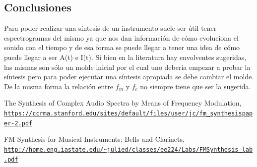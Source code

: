 \documentclass[assd_tp2_main.tex]{subfiles}
\begin{document}
\subsection{Conclusiones}
Para poder realizar una síntesis de un instrumento suele ser útil tener espectrogramas del mismo ya que nos dan información de cómo evoluciona el sonido con el tiempo y de esa forma se puede llegar a tener una idea de cómo puede llegar a ser A(t) e I(t). Si bien en la literatura hay envolventes sugeridas, las mismas son sólo un molde inicial por el cual uno debería empezar a probar la síntesis pero para poder ejecutar una síntesis apropiada se debe cambiar el molde. De la misma forma la relación entre $f_m$ y $f_c$ no siempre tiene que ser la sugerida. 
\begin{thebibliography}{9}
  
The Synthesis of Complex Audio Spectra by Means of Frequency Modulation,
\\\texttt{\url{https://ccrma.stanford.edu/sites/default/files/user/jc/fm_synthesispaper-2.pdf}}

FM Synthesis for Musical Instruments: Bells and Clarinets,
\\\texttt{\url{http://home.eng.iastate.edu/~julied/classes/ee224/Labs/FMSynthesis_lab.pdf}}

\end{thebibliography}
\end{document}
